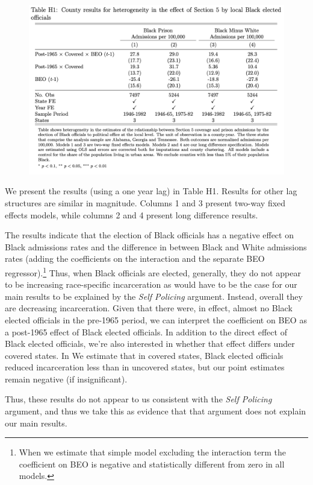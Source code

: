 \documentclass[12pt]{article}
\begin{document}
\begin{figure}[htbp]
	\centering
	\includegraphics[width=\textwidth]{../../60_appendix_cty_results/table_h1.png}
\end{figure}


We present the results (using a one year lag) in Table H1.  Results for other lag structures are similar in magnitude. Columns 1 and 3 present two-way fixed effects models, while columns 2 and 4 present long difference results.

The results indicate that the election of Black officials has a negative effect on Black admissions rates and the difference in between Black and White admissions rates (adding the coefficients on the interaction and the separate BEO regressor).\footnote{When we estimate that simple model excluding the interaction term the coefficient on BEO is negative and statistically different from zero in all models. }  Thus, when Black officials are elected, generally, they do not appear to be increasing race-specific incarceration as would have to be the case for our main results to be explained by the \emph{Self Policing} argument.  Instead, overall they are decreasing incarceration.  Given that there were, in effect, almost no Black elected officials in the pre-1965 period, we can interpret the coefficient on BEO as a post-1965 effect of Black elected officials. In addition to the direct effect of Black elected officials, we're also interested in whether that effect differs under covered states.  In We estimate that in covered states, Black elected officials reduced incarceration less than in uncovered states, but our point estimates remain negative (if insignificant).

Thus, these results do not appear to us consistent with the \emph{Self Policing} argument, and thus we take this as evidence that that argument does not explain our main results.
\end{document}

